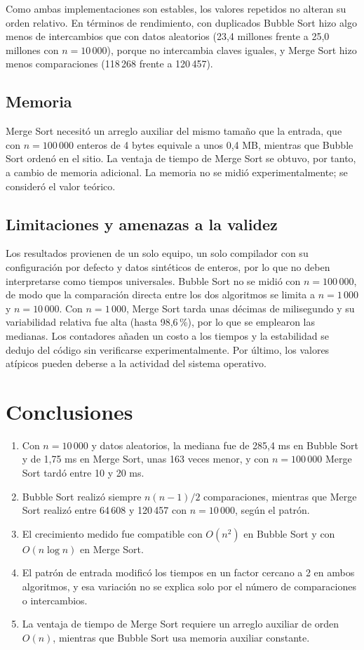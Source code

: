 \documentclass[12pt,a4paper,twocolumn]{article}
\begin{document}
Como ambas implementaciones son estables, los valores repetidos no
alteran su orden relativo. En términos de rendimiento, con duplicados
Bubble Sort hizo algo menos de intercambios que con datos aleatorios
(23,4 millones frente a 25,0 millones con $n = 10\,000$), porque no
intercambia claves iguales, y Merge Sort hizo menos comparaciones
(118\,268 frente a 120\,457).
 
\subsection{Memoria}
 
Merge Sort necesitó un arreglo auxiliar del mismo tamaño que la entrada,
que con $n = 100\,000$ enteros de 4 bytes equivale a unos 0,4 MB, mientras
que Bubble Sort ordenó en el sitio. La ventaja de tiempo de Merge Sort
se obtuvo, por tanto, a cambio de memoria adicional. La memoria no se
midió experimentalmente; se consideró el valor teórico.
 
\subsection{Limitaciones y amenazas a la validez}
 
Los resultados provienen de un solo equipo, un solo compilador con su
configuración por defecto y datos sintéticos de enteros, por lo que no
deben interpretarse como tiempos universales. Bubble Sort no se midió con
$n = 100\,000$, de modo que la comparación directa entre los dos
algoritmos se limita a $n = 1\,000$ y $n = 10\,000$. Con $n = 1\,000$,
Merge Sort tarda unas décimas de milisegundo y su variabilidad relativa
fue alta (hasta 98,6\,\%), por lo que se emplearon las medianas. Los
contadores añaden un costo a los tiempos y la estabilidad se dedujo del
código sin verificarse experimentalmente. Por último, los valores
atípicos pueden deberse a la actividad del sistema operativo.
 
\section{Conclusiones}
 
\begin{enumerate}
\setlength{\itemsep}{2pt}
\item Con $n = 10\,000$ y datos aleatorios, la mediana fue de 285,4 ms en
Bubble Sort y de 1,75 ms en Merge Sort, unas 163 veces menor, y con
$n = 100\,000$ Merge Sort tardó entre 10 y 20 ms.
\item Bubble Sort realizó siempre $n(n-1)/2$ comparaciones, mientras que
Merge Sort realizó entre 64\,608 y 120\,457 con $n = 10\,000$, según el
patrón.
\item El crecimiento medido fue compatible con $O(n^2)$ en Bubble Sort y
con $O(n\log n)$ en Merge Sort.
\item El patrón de entrada modificó los tiempos en un factor cercano a 2
en ambos algoritmos, y esa variación no se explica solo por el número de
comparaciones o intercambios.
\item La ventaja de tiempo de Merge Sort requiere un arreglo auxiliar de
orden $O(n)$, mientras que Bubble Sort usa memoria auxiliar constante.
\end{enumerate}
 
\end{document}
